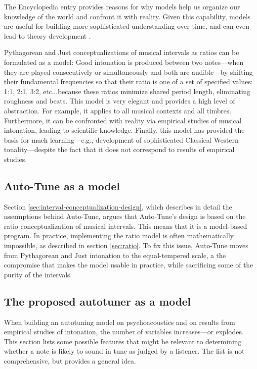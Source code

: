 The Encyclopedia entry provides reasons for why models help us organize our knowledge of the world and confront it with reality. Given this capability, models are useful for building more sophisticated understanding over time, and can even lead to theory development \cite{sep-models-science}.

Pythagorean and Just conceptualizations of musical intervals as ratios can be formulated as a model: Good intonation is produced between two notes---when they are played consecutively or simultaneously and both are audible---by shifting their fundamental frequencies so that their ratio is one of a set of specified values: 1:1, 2:1, 3:2, etc...because these ratios minimize shared period length, eliminating roughness and beats. This model is very elegant and provides a high level of abstraction. For example, it applies to all musical contexts and all timbres. Furthermore, it can be confronted with reality via empirical studies of musical intonation, leading to scientific knowledge. Finally, this model has provided the basis for much learning---e.g., development of sophisticated Classical Western tonality---despite the fact that it does not correspond to results of empirical studies. 

\subsection{Auto-Tune as a model}
Section \ref{sec:interval-conceptualization-design}, which describes in detail the assumptions behind Auto-Tune, argues that Auto-Tune's design is based on the ratio conceptualization of musical intervals. This means that it is a model-based program. In practice, implementing the ratio model is often mathematically impossible, as described in section \ref{sec:ratio}. To fix this issue, Auto-Tune moves from Pythagorean and Just intonation to the equal-tempered scale, a the compromise that makes the model usable in practice, while sacrificing some of the purity of the intervals.

\subsection{The proposed autotuner as a model}
\label{sec:proposed-as-model}
When building an autotuning model on psychoacoustics and on results from empirical studies of intonation, the number of variables increases---or explodes. This section lists some possible features that might be relevant to determining whether a note is likely to sound in tune as judged by a listener. The list is not comprehensive, but provides a general idea.

